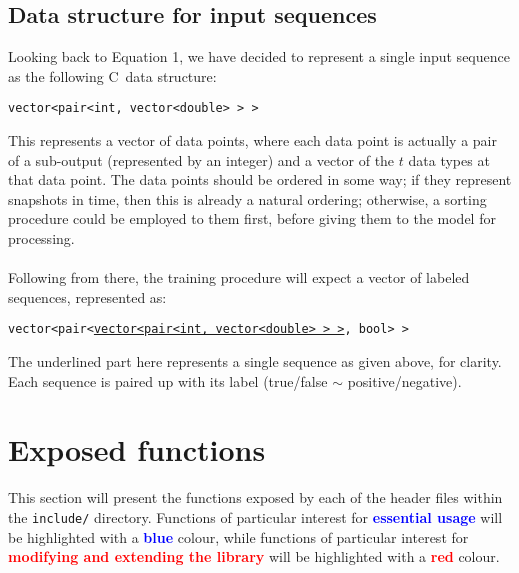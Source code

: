 \documentclass[12pt,openany]{article}
\def\CC{{C\nolinebreak[4]\hspace{-.05em}\raisebox{.4ex}{\tiny\bf ++}}}
\begin{document}
	\subsection{Data structure for input sequences}
	Looking back to Equation 1, we have decided to represent a single input sequence as the following \CC\ data structure:
	\begin{center}
		{\tt vector<pair<int, vector<double> > >}
	\end{center}
	This represents a vector of data points, where each data point is actually a pair of a sub-output (represented by an integer) and a vector of the $t$ data types at that data point. The data points should be ordered in some way; if they represent snapshots in time, then this is already a natural ordering; otherwise, a sorting procedure could be employed to them first, before giving them to the model for processing.\\ \\
	Following from there, the training procedure will expect a vector of labeled sequences, represented as:
	\begin{center}
		{\tt vector<pair<\underline{\ttfamily {}\selectfont vector<pair<int, vector<double> > >}, bool> >}
	\end{center}
	The underlined part here represents a single sequence as given above, for clarity. Each sequence is paired up with its label (true/false $\sim$ positive/negative).
	
	\section{Exposed functions}\label{sec:func}
	This section will present the functions exposed by each of the header files within the {\tt include/} directory. Functions of particular interest for {\bf \textcolor{blue}{essential usage}} will be highlighted with a {\bf \textcolor{blue}{blue}} colour, while functions of particular interest for {\bf \textcolor{red}{modifying and extending the library}} will be highlighted with a {\bf \textcolor{red}{red}} colour.
\end{document}

